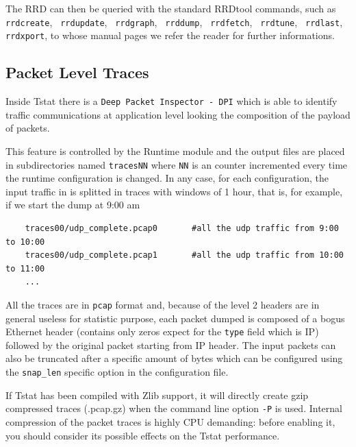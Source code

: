 \documentclass[11pt]{article}
\begin{document}
The RRD can then be queried with the standard RRDtool commands, such as
\texttt{rrdcreate}, \texttt{ rrdupdate},  \texttt{ rrdgraph}, \texttt{ rrddump}, \texttt{ rrdfetch}, 
\texttt{ rrdtune}, \texttt{ rrdlast}, \texttt{ rrdxport}, to whose manual pages we refer 
the reader for further informations.

\subsection{Packet Level Traces\label{Packet_Level_Traces}}


Inside Tstat there is a \texttt{Deep Packet Inspector - DPI} which is able to identify
traffic communications at application level looking the composition of the payload
of packets.



This feature is controlled by the \textsf{Runtime module} and the output
files are placed in subdirectories named \texttt{tracesNN} where \texttt{NN} is an counter
incremented every time the runtime configuration is changed.
In any case, for each configuration, the input traffic in 
is splitted in traces with windows of 1 hour, that is, for example,
if we start the dump at 9:00 am

\begin{small}\begin{verbatim}
    traces00/udp_complete.pcap0       #all the udp traffic from 9:00  to 10:00
    traces00/udp_complete.pcap1       #all the udp traffic from 10:00 to 11:00
    ...
\end{verbatim}\end{small} \noindent
All the traces are in \texttt{pcap} format and, because of the level 2 headers are in
general useless for statistic purpose, each packet dumped is composed of a bogus
Ethernet header (contains only zeros expect for the \texttt{type} field which is IP)
followed by the original packet starting from IP header. The input packets
can also be truncated after a specific amount of bytes which can be configured
using the \texttt{snap\_len} specific option in the configuration file.



If Tstat has been compiled with Zlib support, it will directly create gzip compressed 
traces (.pcap.gz) when the command line option \texttt{-P} is used. Internal compression 
of the packet traces is highly CPU demanding: before enabling it, you should consider 
its possible effects on the Tstat performance.
\end{document}
